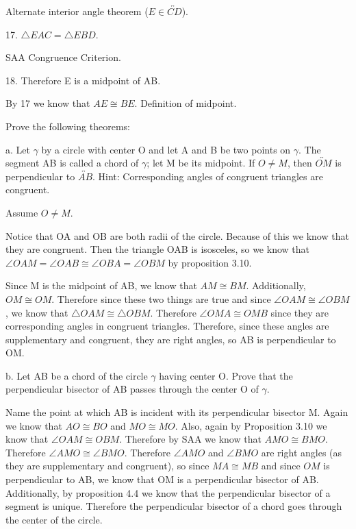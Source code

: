 \documentclass[12pt,letterpaper]{article}
\newcommand{\prob}[1]{\newpage\noindent {\bf #1}}
\begin{document}
Alternate interior angle theorem ($E\in \overleftrightarrow{CD}$).

17. $\triangle EAC = \triangle EBD.$ 

SAA Congruence Criterion.

18.  Therefore E is a midpoint of AB.

By 17 we know that $AE \cong BE$. 
Definition of midpoint.





\prob{17}Prove the following theorems:

a. Let $\gamma$ by a circle with center O and let A and B be two points on $\gamma$.   The segment AB is called a chord of $\gamma$;  let M be its midpoint.  If $O\neq M$, then $\overleftrightarrow{OM}$ is perpendicular to $\overleftrightarrow{AB}$. Hint:  Corresponding angles of congruent triangles are congruent.

Assume $O \neq M$.

Notice that OA and OB are both radii of the circle. Because of this we know that they are congruent. Then the triangle OAB is isosceles, so we know that $\angle OAM = \angle OAB \cong \angle OBA = \angle OBM$ by proposition 3.10.

Since M is the midpoint of AB, we know that $AM \cong BM$.  Additionally, $OM \cong OM$.  Therefore since these two things are true and since $\angle OAM \cong \angle OBM$, we know that $\triangle OAM \cong \triangle OBM$.  Therefore $\angle OMA \cong OMB$ since they are corresponding angles in congruent triangles.  Therefore, since these angles are supplementary and congruent, they are right angles, so AB is perpendicular to OM.



b. Let AB be a chord of the circle $\gamma$ having center O. Prove that the perpendicular bisector of AB passes through the center O of $\gamma$. 

Name the point at which AB is incident with its perpendicular bisector M. Again we know that $AO \cong BO$ and $MO \cong MO$.  Also, again by Proposition 3.10 we know that $\angle OAM \cong OBM$.  Therefore by SAA we know that $AMO \cong BMO$.  Therefore $\angle AMO \cong \angle BMO$. Therefore $\angle AMO$ and $\angle BMO$ are right angles (as they are supplementary and congruent), so since $MA \cong MB$ and since $OM$ is perpendicular to AB, we know that OM is a perpendicular bisector of AB.  Additionally, by proposition 4.4 we know that the perpendicular bisector of a segment is unique.  Therefore the perpendicular bisector of a chord goes through the center of the circle.
\end{document}
